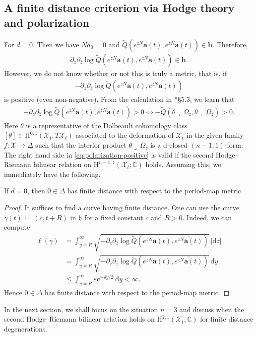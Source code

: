 \subsection{A finite distance criterion via Hodge theory and polarization}
For \(d=0\). Then we have \(Na_{0}=0\) and 
\(\tilde{Q}(e^{zN}\mathbf{a}(t),\overline{e^{zN}\mathbf{a}(t)}) \in \mathbf{h}\). Therefore,
\begin{eqnarray*}
\partial_{z}\partial_{\bar{z}}\log
\tilde{Q}(e^{zN}\mathbf{a}(t),\overline{e^{zN}\mathbf{a}(t)}) \in \mathbf{h}.
\end{eqnarray*}
However, we do not know whether or not this is truly a metric, that is, if
\begin{eqnarray*}
-\partial_{z}\partial_{\bar{z}}\log\tilde{Q}(e^{zN}\mathbf{a}(t),\overline{e^{zN}\mathbf{a}(t)})
\end{eqnarray*}
is positive
(even non-negative).
From the calculation in \cite{2019-Popovici-holomorphic-deformations-of-balanced-calabi-yau-d-dbar-manifolds}*{\S 5.3},
we learn that 
\begin{eqnarray}
\label{eq:polarization-positive}
-\partial_{z}\partial_{\bar{z}}\log
\tilde{Q}(e^{zN}\mathbf{a}(t),\overline{e^{zN}\mathbf{a}(t)})>0 \Longleftrightarrow
-\tilde{Q}(\theta\lrcorner~\Omega_{z},\overline{\theta\lrcorner~\Omega_{z}})>0.
\end{eqnarray}
Here \(\theta\) is a representative of 
the Dolbeault cohomology class 
\([\theta]\in\mathrm{H}^{0,1}(\mathcal{X}_{t},T\mathcal{X}_{t})\)
associated to the deformation of \(\mathcal{X}_{t}\) in the given family 
\(f\colon\mathcal{X}\to\Delta\) 
such that the interior product 
\(\theta\lrcorner~\Omega_{z}\) is a \(\mathrm{d}\)-closed \((n-1,1)\)-form.
The right hand side in \eqref{eq:polarization-positive} is valid if
the second Hodge--Riemann bilinear relation
on \(\mathrm{H}^{n-1,1}(\mathcal{X}_{t};\mathbb{C})\) holds.
Assuming this, we immediately have the following.
\begin{theorem}
\label{thm:finite-distance}
If \(d=0\), then \(0\in \Delta\) has finite distance with respect to
the period-map metric.
\end{theorem}
\begin{proof}
It suffices to find a curve having finite distance.
One can use the curve \(\gamma(t):=(c,t+R)\) in \(\mathfrak{h}\)
for a fixed constant \(c\) and \(R>0\). Indeed, we can compute
\begin{align*}
\ell(\gamma)&=\int_{y=R}^{\infty} \sqrt{-\partial_{z}\partial_{\bar{z}}\log
\tilde{Q}(e^{zN}\mathbf{a}(t),\overline{e^{zN}\mathbf{a}(t)})}~|\mathrm{d}z|\\
&=\int_{y=R}^{\infty} \sqrt{-\partial_{z}\partial_{\bar{z}}\log
\tilde{Q}(e^{zN}\mathbf{a}(t),\overline{e^{zN}\mathbf{a}(t)})}~\mathrm{d}y\\
&\le \int_{y=R}^{\infty}\varepsilon e^{-\delta y/2}~\mathrm{d}y <\infty.
\end{align*}
Hence \(0\in\Delta\) has finite distance with respect to 
the period-map metric.
\end{proof}
In the next section, we shall focus on the situation \(n=3\) and discuss when
the second Hodge--Riemann bilinear relation holds on 
\(\mathrm{H}^{2,1}(\mathcal{X}_{t};\mathbb{C})\)
for finite distance degenerations.

